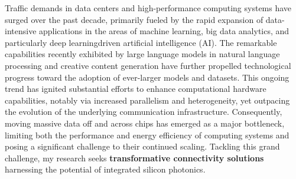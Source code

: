 Traffic demands in data centers and high-performance computing systems have surged over the past decade, primarily fueled by the rapid expansion of data-intensive applications in the areas of machine learning, big data analytics, and particularly deep learning\textendash driven artificial intelligence (AI). The remarkable capabilities recently exhibited by large language models in natural language processing and creative content generation have further propelled technological progress toward the adoption of ever-larger models and datasets. This ongoing trend has ignited substantial efforts to enhance computational hardware capabilities, notably via increased parallelism and heterogeneity, yet outpacing the evolution of the underlying communication infrastructure. Consequently, moving massive data off and across chips has emerged as a major bottleneck, limiting both the performance and energy efficiency of computing systems and posing a significant challenge to their continued scaling. Tackling this grand challenge, my research seeks \textbf{transformative connectivity solutions} harnessing the potential of integrated silicon photonics.

